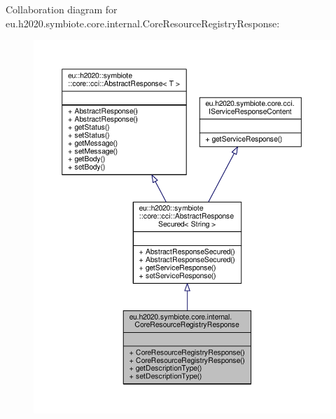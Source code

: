 Collaboration diagram for eu.\+h2020.\+symbiote.\+core.\+internal.\+Core\+Resource\+Registry\+Response\+:
\nopagebreak
\begin{figure}[H]
\begin{center}
\leavevmode
\includegraphics[width=350pt]{classeu_1_1h2020_1_1symbiote_1_1core_1_1internal_1_1CoreResourceRegistryResponse__coll__graph}
\end{center}
\end{figure}
